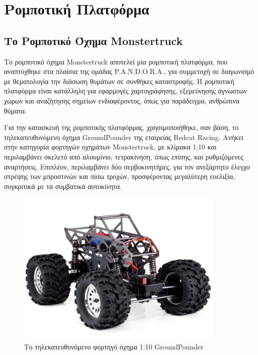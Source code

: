 
\chapter{Ρομποτική Πλατφόρμα} %


\label{Chapter2} %


\section{Το Ρομποτικό Όχημα Monstertruck}
\par
Το ρομποτικό όχημα Monstertruck αποτελεί μία ρομποτική πλατφόρμα, που αναπτύχθηκε στα πλαίσια 
της ομάδας P.A.N.D.O.R.A., για συμμετοχή σε διαγωνισμό με θεματολογία την διάσωση θυμάτων σε 
συνθήκες καταστροφής. Η ρομποτική πλατφόρμα είναι κατάλληλη για εφαρμογές χαρτογράφησης, 
εξερεύνησης άγνωστων χώρων και αναζήτησης σημείων ενδιαφέροντος, όπως για παράδειγμα, ανθρώπινα 
θύματα.

\bigskip\par
Για την κατασκευή της ρομποτικής πλατφόρμας, χρησιμοποιήθηκε, σαν βάση, το τηλεκατευθυνόμενο 
όχημα GroundPounder της εταιρείας Redcat Racing. Ανήκει στην κατηγορία φορτηγών οχημάτων 
Monstertruck, με κλίμακα 1:10 και περιλαμβάνει σκελετό από αλουμίνιο, τετρακίνηση, όπως επίσης, 
και ρυθμιζόμενες αναρτήσεις. Επιπλέον, περιλαμβάνει δύο σερβοκινητήρες, για τον ανεξάρτητο 
έλεγχο στρέψης των μπροστινών και πίσω τροχών, προσφέροντας μεγαλύτερη ευελιξία, συγκριτικά με 
τα συμβατικά αυτοκίνητα.\\

\begin{figure}[!h]
	\begin{center}
		\includegraphics[width=10cm]{Chapters/Chapter2/Figures/groundpounder_chassis.jpg}
		\caption{Το τηλεκατευθυνόμενο φορτηγό όχημα 1:10 GroundPounder}
		\label{fig:groundpounder_chassis}
	\end{center}
\end{figure}

